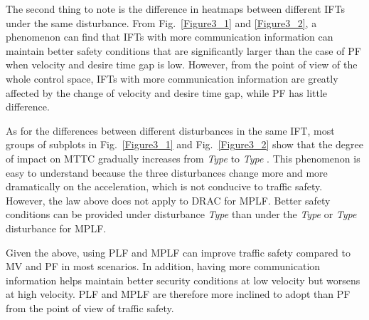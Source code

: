 \documentclass[journal]{IEEEtran}
\begin{document}
The second thing to note is the difference in heatmaps between different IFTs under the same disturbance. From Fig.~\ref{Figure3_1} and \ref{Figure3_2}, a phenomenon can find that IFTs with more communication information can maintain better safety conditions that are significantly larger than the case of PF when velocity and desire time gap is low. However, from the point of view of the whole control space, IFTs with more communication information are greatly affected by the change of velocity and desire time gap, while PF has little difference.

As for the differences between different disturbances in the same IFT, most groups of subplots in Fig.~\ref{Figure3_1} and Fig.~\ref{Figure3_2} show that the degree of impact on MTTC gradually increases from \textit{Type \uppercase\expandafter{}} to \textit{Type \uppercase\expandafter{}}. This phenomenon is easy to understand because the three disturbances change more and more dramatically on the acceleration, which is not conducive to traffic safety. However, the law above does not apply to DRAC for MPLF. Better safety conditions can be provided under disturbance \textit{Type \uppercase\expandafter{}} than under the \textit{Type \uppercase\expandafter{}} or \textit{Type \uppercase\expandafter{}} disturbance for MPLF.

Given the above, using PLF and MPLF can improve traffic safety compared to MV and PF in most scenarios. In addition, having more communication information helps maintain better security conditions at low velocity but worsens at high velocity. PLF and MPLF are therefore more inclined to adopt than PF from the point of view of traffic safety.


\end{document}
